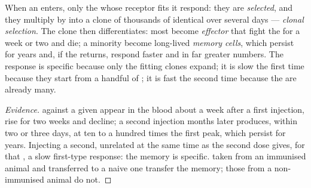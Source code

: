 \begin{proposition}\label{prop:g12:adaptive-immunity:selection}
When an  enters, only the  whose receptor fits it
respond: they are \emph{selected}, and they multiply by  into
a clone of thousands of identical  over several days ---
\emph{clonal selection}. The clone then
differentiates: most  become \emph{effector } that fight the
 for a week or two and die; a minority become long-lived
\emph{memory cells}, which persist for years and,
if the  returns, respond faster and in far greater numbers. The
response is specific because only the fitting clones expand; it is
slow the first time because they start from a handful of ; it is
fast the second time because the  are already many.
\end{proposition}
\begin{proof}[Evidence]
 against a given  appear in the blood about a week
after a first injection, rise for two weeks and decline; a second
injection months later produces, within two or three days, 
at ten to a hundred times the first peak, which persist for years.
Injecting a second, unrelated  at the same time as the second
dose gives, for that , a slow first-type response: the memory
is specific.  taken from an immunised animal and
transferred to a naive one transfer the memory; those from a
non-immunised animal do not.
\end{proof}

